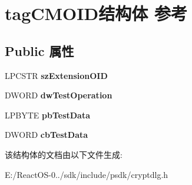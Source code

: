 \hypertarget{structtag_c_m_o_i_d}{}\section{tag\+C\+M\+O\+I\+D结构体 参考}
\label{structtag_c_m_o_i_d}
\subsection*{Public 属性}
\begin{DoxyCompactItemize}
\item 
\mbox{\label{structtag_c_m_o_i_d_adec3d469c03a220b46ecd1c98720a5f9}} 
L\+P\+C\+S\+TR {\bfseries sz\+Extension\+O\+ID}
\item 
\mbox{\label{structtag_c_m_o_i_d_adb18a259389a567469e68910256467e9}} 
D\+W\+O\+RD {\bfseries dw\+Test\+Operation}
\item 
\mbox{\label{structtag_c_m_o_i_d_acb29c0ec9bef78a086774362e4529644}} 
L\+P\+B\+Y\+TE {\bfseries pb\+Test\+Data}
\item 
\mbox{\label{structtag_c_m_o_i_d_ace12e52ab8ed35a14ca58194a87292df}} 
D\+W\+O\+RD {\bfseries cb\+Test\+Data}
\end{DoxyCompactItemize}


该结构体的文档由以下文件生成\+:\begin{DoxyCompactItemize}
\item 
E\+:/\+React\+O\+S-\/0../sdk/include/psdk/cryptdlg.\+h\end{DoxyCompactItemize}
